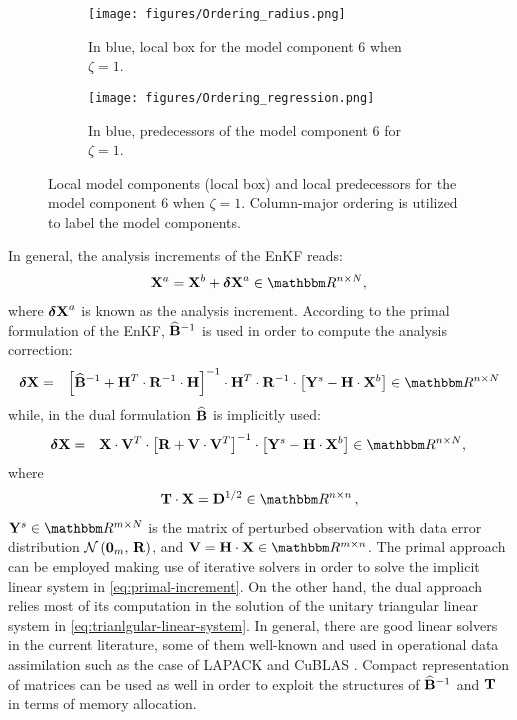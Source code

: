 \documentclass[12pt]{article}
\newcommand{\T}{{\bf T}}
\newcommand{\ra}{\zeta}
\newcommand{\Nens}{N} \newcommand{\Nobs}{m} \newcommand{\Nstate}{n} \newcommand{\X}{{\bf X}} \newcommand{\x}{{\bf x}} \newcommand{\J}{\mathcal{J}} \newcommand{\lp}{\left (} \newcommand{\rp}{\right )} \newcommand{\lb}{\left [} \newcommand{\rb}{\right ]} \renewcommand{\ln}{\left \|} \newcommand{\rn}{\right \|}
\newcommand{\DX}{{{\boldsymbol \delta} {\bf X}}}
\newcommand{\D}{{\bf D}}
\newcommand{\zero}{{\bf 0}}
\newcommand{\BEST}{\widehat{\bf B}}
\newcommand{\V}{{\bf V}}
\begin{document}
\begin{figure}[H]
\centering
\begin{subfigure}{0.4\textwidth}
\centering
\texttt{[image: figures/Ordering\_radius.png]}
\caption{In blue, local box for the model component 6 when $\ra=1$.}
\end{subfigure} \hspace{1em}
\begin{subfigure}{0.4\textwidth}
\centering
\texttt{[image: figures/Ordering\_regression.png]}
\caption{In blue, predecessors of the model component 6 for $\ra=1$.}
\end{subfigure}
\caption{Local model components (local box) and local predecessors for the model component 6 when $\ra=1$. Column-major ordering is utilized to label the model components.}
\label{fig:predecessors}
\end{figure}
In general, the analysis increments of the EnKF reads:
\begin{eqnarray}
\label{eq:analysis-ensemble}
\X^a = \X^b + \DX^a \in \Re^{\Nstate \times \Nens} ,\,
\end{eqnarray}
where $\DX^a$ is known as the analysis increment. According to the primal formulation of the EnKF, $\BEST^{-1}$ is used in order to compute the analysis correction:
\begin{eqnarray}
\label{eq:primal-increment}
\displaystyle 
\DX &=& \lb \BEST^{-1}  + \H^T \cdot \R^{-1} \cdot \H \rb^{-1} \cdot \H^T \cdot \R^{-1} \cdot  \lb \Y^s-\H \cdot \X^b \rb \in \Re^{\Nstate \times \Nens}
\end{eqnarray}
while, in the dual formulation $\BEST$ is implicitly used:
\begin{eqnarray}
\label{eq:dual-increment}
\displaystyle
\DX &=& \X \cdot \V^T \cdot \lb\R + \V \cdot \V^T \rb^{-1} \cdot \lb \Y^s - \H \cdot \X^b \rb \in \Re^{\Nstate \times \Nens} , \,
\end{eqnarray}
where
\begin{eqnarray}
\label{eq:trianlgular-linear-system}
\displaystyle \T \cdot \X = \D^{1/2} \in \Re^{\Nstate \times \Nstate} \,,
\end{eqnarray}
$\Y^s \in \Re^{\Nobs \times \Nens}$ is the matrix of perturbed observation with data error distribution $\Nor \lp \zero_{\Nobs },\, \R\rp$, and $\V = \H \cdot \X \in \Re^{\Nobs \times \Nstate}$. The primal approach can be employed making use of iterative solvers in order to solve the implicit linear system in \eqref{eq:primal-increment}. On the other hand, the dual approach relies most of its computation in the solution of the unitary triangular linear system in \eqref{eq:trianlgular-linear-system}. In general, there are good linear solvers in the current literature, some of them well-known and used in operational data assimilation such as the case of LAPACK \cite{LAPACKLIB} and CuBLAS \cite{BLASLIB}. Compact representation of matrices can be used as well in order to exploit the structures of $\BEST^{-1}$ and $\T$ in terms of memory allocation.
\end{document}
